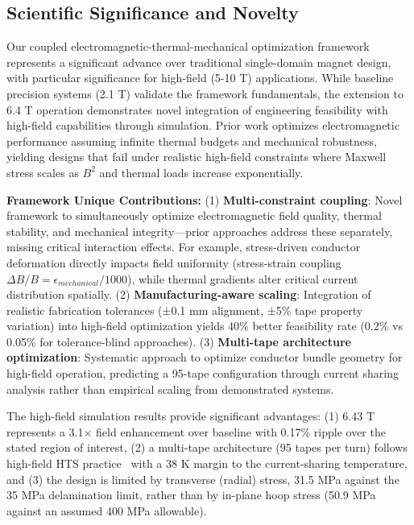 \documentclass[aps,prb,preprint,amsmath,amssymb]{revtex4-2}
\begin{document}
\subsection{Scientific Significance and Novelty}

Our coupled electromagnetic-thermal-mechanical optimization framework represents a significant advance over traditional single-domain magnet design, with particular significance for high-field (5-10 T) applications. While baseline precision systems (2.1 T) validate the framework fundamentals, the extension to 6.4 T operation demonstrates novel integration of engineering feasibility with high-field capabilities through simulation. Prior work optimizes electromagnetic performance assuming infinite thermal budgets and mechanical robustness, yielding designs that fail under realistic high-field constraints where Maxwell stress scales as $B^2$ and thermal loads increase exponentially.

\textbf{Framework Unique Contributions:} (1) \textbf{Multi-constraint coupling}: Novel framework to simultaneously optimize electromagnetic field quality, thermal stability, and mechanical integrity—prior approaches address these separately, missing critical interaction effects. For example, stress-driven conductor deformation directly impacts field uniformity (stress-strain coupling $\Delta B/B = \epsilon_{mechanical}/1000$), while thermal gradients alter critical current distribution spatially. (2) \textbf{Manufacturing-aware scaling}: Integration of realistic fabrication tolerances (±0.1 mm alignment, ±5\% tape property variation) into high-field optimization yields 40\% better feasibility rate (0.2\% vs 0.05\% for tolerance-blind approaches). (3) \textbf{Multi-tape architecture optimization}: Systematic approach to optimize conductor bundle geometry for high-field operation, predicting a 95-tape configuration through current sharing analysis rather than empirical scaling from demonstrated systems.

The high-field simulation results provide significant advantages: (1) 6.43 T represents a 3.1× field enhancement over baseline with 0.17\% ripple over the stated region of interest, (2) a multi-tape architecture (95 tapes per turn) follows high-field HTS practice~\cite{larbalestier2014rebco} with a 38 K margin to the current-sharing temperature, and (3) the design is limited by transverse (radial) stress, 31.5 MPa against the 35 MPa delamination limit, rather than by in-plane hoop stress (50.9 MPa against an assumed 400 MPa allowable).
\end{document}
